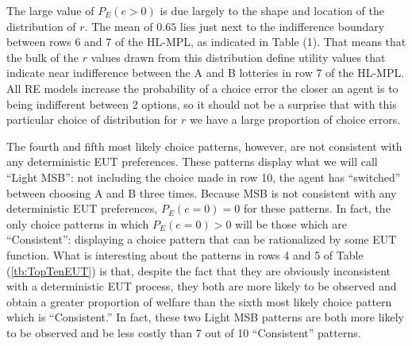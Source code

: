 \documentclass[../main.tex]{subfiles}
\begin{document}
The large value of $P_E(e >0)$ is due largely to the shape and location of the distribution of $r$.
The mean of $0.65$ lies just next to the indifference boundary between rows 6 and 7 of the HL-MPL, as indicated in Table (1).
That means that the bulk of the $r$ values drawn from this distribution define utility values that indicate near indifference between the A and B lotteries in row 7 of the HL-MPL.
All RE models increase the probability of a choice error the closer an agent is to being indifferent between 2 options, so it should not be a surprise that with this particular choice of distribution for $r$ we have a large proportion of choice errors.

The fourth and fifth most likely choice patterns, however, are not consistent with any deterministic EUT preferences.
These patterns display what we will call \enquote{Light MSB}: not including the choice made in row 10, the agent has \enquote{switched} between choosing A and B three times.{\footnotemark}
Because MSB is not consistent with any deterministic EUT preferences, $P_E(e=0)=0$ for these patterns.
In fact, the only choice patterns in which $P_E(e=0)>0$ will be those which are \enquote{Consistent}: displaying a choice pattern that can be rationalized by some EUT function.
What is interesting about the patterns in rows 4 and 5 of Table (\ref{tb:TopTenEUT}) is that, despite the fact that they are obviously inconsistent with a deterministic EUT process, they both are more likely to be observed and obtain a greater proportion of welfare than the sixth most likely choice pattern which is \enquote{Consistent.}
In fact, these two Light MSB patterns are both more likely to be observed and be less costly than 7 out of 10 \enquote{Consistent} patterns.

\addtocounter{footnote}{-1}
\end{document}
